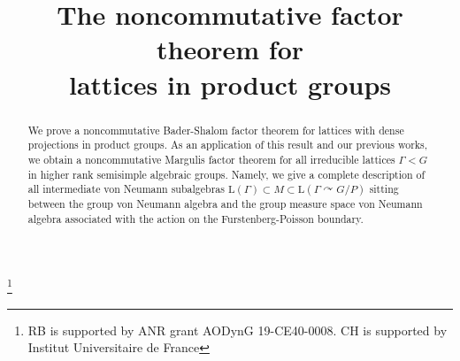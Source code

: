 \documentclass[JEP,XML,SOM,Unicode,published]{cedram}
\theoremstyle{definition}
\begin{document}
\frontmatter

\title[The noncommutative factor theorem for lattices in product groups]{The noncommutative factor theorem for\\ lattices in product groups}

\author[\initial{R.} \lastname{Boutonnet}]{ }
\address{Institut de Mathématiques de Bordeaux, CNRS, Université Bordeaux I\\
33405 Talence, France}

\author[\initial{C.} \lastname{Houdayer}]{ }
\address{Université Paris-Saclay, Laboratoire de Mathématiques d'Orsay, CNRS, Institut Universitaire de France\\
91405 Orsay, France}

\thanks{RB is supported by ANR grant AODynG 19-CE40-0008. CH is supported by Institut Universitaire de France}

\begin{abstract}
We prove a noncommutative Bader-Shalom factor theorem for lattices with dense projections in product groups. As an application of this result and our previous works, we obtain a noncommutative Margulis factor theorem for all irreducible lattices $\Gamma < G$ in higher rank semisimple algebraic groups. Namely, we give a complete description of all intermediate von Neumann subalgebras $\mathrm{L}(\Gamma) \subset M \subset \mathrm{L}(\Gamma \curvearrowright G/P)$ sitting between the group von Neumann algebra and the group measure space von Neumann algebra associated with the action on the Furstenberg-Poisson boundary.
\end{abstract}



\end{document}
